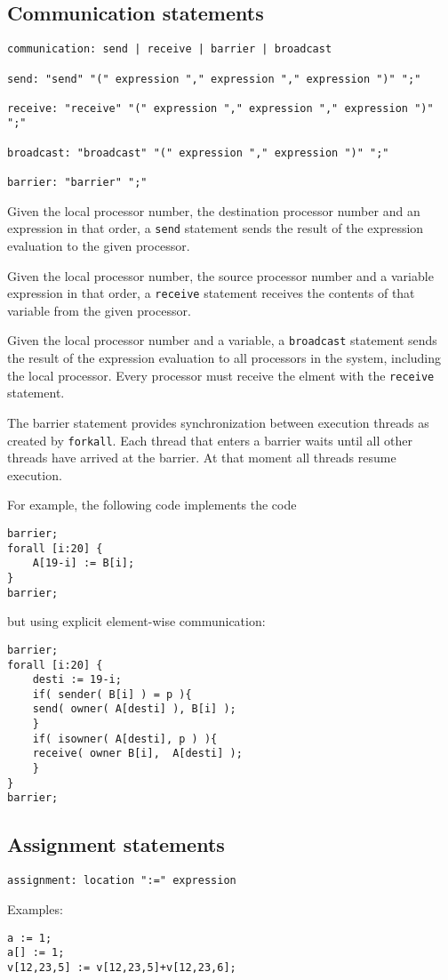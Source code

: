 \documentclass[a4paper]{article}
\begin{document}
\subsection{Communication statements}
\begin{verbatim}
communication: send | receive | barrier | broadcast

send: "send" "(" expression "," expression "," expression ")" ";"

receive: "receive" "(" expression "," expression "," expression ")" ";"

broadcast: "broadcast" "(" expression "," expression ")" ";"

barrier: "barrier" ";"
\end{verbatim}
Given the local processor number, the destination processor number and
an expression in that order, a \verb'send'
statement sends the result of the expression evaluation
to the given processor.
\par
Given the local processor number, the source processor number and a
variable expression in that order, a \verb'receive'
statement receives the contents of that
variable from the given processor.
\par
Given the local processor number and a variable,
 a \verb'broadcast' statement sends the result
of the expression evaluation to all processors in the system, including
the local processor. Every processor must receive the elment with the
\verb'receive' statement.
\par
The barrier statement provides synchronization between execution
threads as created by \verb'forkall'.
Each thread that enters a barrier waits until all other threads have
arrived at the barrier. At that moment all threads resume execution.
\par
For example, the following code implements the code
\begin{verbatim}
barrier;
forall [i:20] {
    A[19-i] := B[i];
}
barrier;
\end{verbatim}
but using explicit element-wise communication:
\begin{verbatim}
barrier;
forall [i:20] {
    desti := 19-i;
    if( sender( B[i] ) = p ){
	send( owner( A[desti] ), B[i] );
    }
    if( isowner( A[desti], p ) ){
	receive( owner B[i],  A[desti] );
    }
}
barrier;
\end{verbatim}
\subsection{Assignment statements}
\begin{verbatim}
assignment: location ":=" expression
\end{verbatim}
Examples:
\begin{verbatim}
a := 1;
a[] := 1;
v[12,23,5] := v[12,23,5]+v[12,23,6];
\end{verbatim}
\end{document}
